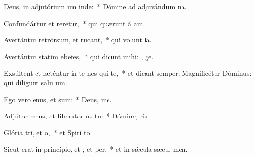 \item Deus, in adjutórium um inde:~* Dómine ad adjuvándum  na.
\item Confundántur et reretur,~* qui quærunt á am.
\item Avertántur retrórsum, et rucant,~* qui volunt  la.
\item Avertántur statim ebetes,~* qui dicunt mihi: , ge.
\item Exsúltent et læténtur in te nes qui  te,~* et dicant semper: Magnificétur Dóminus: qui díligunt salu um.
\item Ego vero enus, et  sum:~* Deus,  me.
\item Adjútor meus, et liberátor us  tu:~* Dómine,  ris.
\item Glória tri, et o,~* et Spirí to.
\item Sicut erat in princípio, et , et per,~* et in sǽcula sæcu. men.
